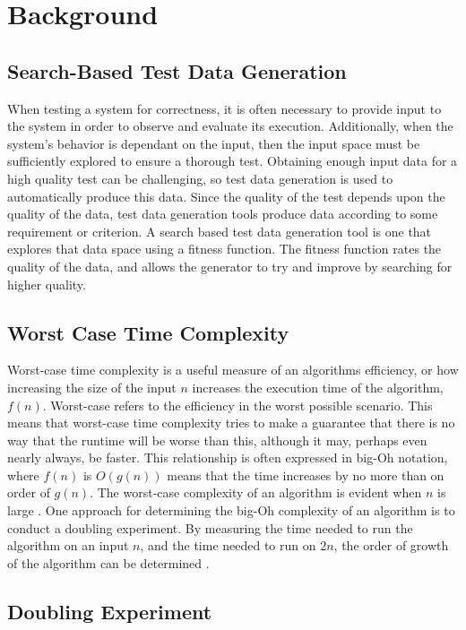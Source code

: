 \section{Background}

\subsection{Search-Based Test Data Generation}
When testing a system for correctness, it is often necessary to
provide input to the system in order to observe and evaluate its
execution. Additionally, when the system's behavior is dependant on the
input, then the input space must be sufficiently explored to ensure a
thorough test.  Obtaining enough input data for a high quality test can
be challenging, so test data generation is used to automatically
produce this data. Since the quality of the test depends upon the
quality of the data, test data generation tools produce data according
to some requirement or criterion. A search based test data generation
tool is one that explores that data space using a fitness function.  The
fitness function rates the quality of the data, and allows the generator
to try and improve by searching for higher quality.

\subsection{Worst Case Time Complexity}

Worst-case time complexity is a useful measure of an algorithms
efficiency, or how increasing the size
of the input $n$ increases the execution time of the algorithm, $f(n)$.
Worst-case refers to the efficiency in the worst possible scenario. This
means that worst-case time complexity tries to make a guarantee that
there is no way that the runtime will be worse than this, although it
may, perhaps even nearly always, be faster. 
This relationship is often expressed in big-Oh notation, where $f(n)$
is $O(g(n))$ means that the time increases by no more than on order of $g(n)$. The
worst-case complexity of an algorithm is evident when $n$ is large 
\cite{Goodrich:Data}. One approach for determining the big-Oh complexity
of an algorithm is to conduct a doubling experiment. By measuring the
time needed to run the algorithm on an input $n$, and the time needed to
run on $2n$, the order of growth of the algorithm can be determined \cite{Mcgeoch:Algorithmics,Sedgewick:Analysis}. 

\subsection{Doubling Experiment}

